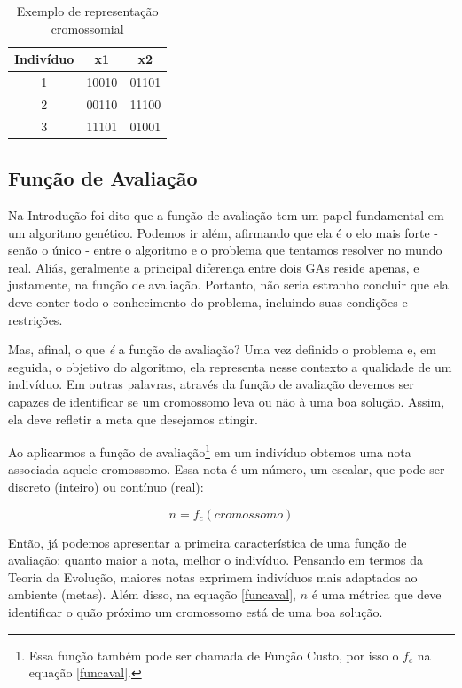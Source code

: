 	\begin{table}[htp]
 \caption{\label{tabCromo}Exemplo de representação cromossomial}
 \begin{center}
  \begin{tabular}{c|c|c}
   \hline
   Indivíduo & x1  & x2 \\
   \hline
   1 & 10010    & 01101 \\
   2 & 00110    & 11100 \\
   3 & 11101		& 01001 \\ 
   \hline
   \end{tabular}
 \end{center}
\end{table}

	
	\subsection{Função de Avaliação}
	
	Na Introdução foi dito que a função de avaliação tem um papel fundamental em um algoritmo genético. Podemos ir além, afirmando que ela é o elo mais forte - senão o único - entre o algoritmo e o problema que tentamos resolver no mundo real. Aliás, geralmente a principal diferença entre dois GAs reside apenas, e justamente, na função de avaliação. Portanto, não seria estranho concluir que ela deve conter todo o conhecimento do problema, incluindo suas condições e restrições.
	
	Mas, afinal, o que \textit{é} a função de avaliação? Uma vez definido o problema e, em seguida, o objetivo do algoritmo, ela representa nesse contexto a qualidade de um indivíduo. Em outras palavras, através da função de avaliação devemos ser capazes de identificar se um cromossomo leva ou não à uma boa solução. Assim, ela deve refletir a meta que desejamos atingir.
	
	Ao aplicarmos a função de avaliação\footnote{Essa função também pode ser chamada de Função Custo, por isso o $f_c$ na equação \ref{funcaval}.} em um indivíduo obtemos uma nota associada aquele cromossomo. Essa nota é um número, um escalar, que pode ser discreto (inteiro) ou contínuo (real):
	
	\begin{equation}\label{funcaval}
		n = f_c(cromossomo)
	\end{equation}
	
	Então, já podemos apresentar a primeira característica de uma função de avaliação: quanto maior a nota, melhor o indivíduo. Pensando em termos da Teoria da Evolução, maiores notas exprimem indivíduos mais adaptados ao ambiente (metas). Além disso, na equação \ref{funcaval}, $n$ é uma métrica que deve identificar o quão próximo um cromossomo está de uma boa solução.
	
